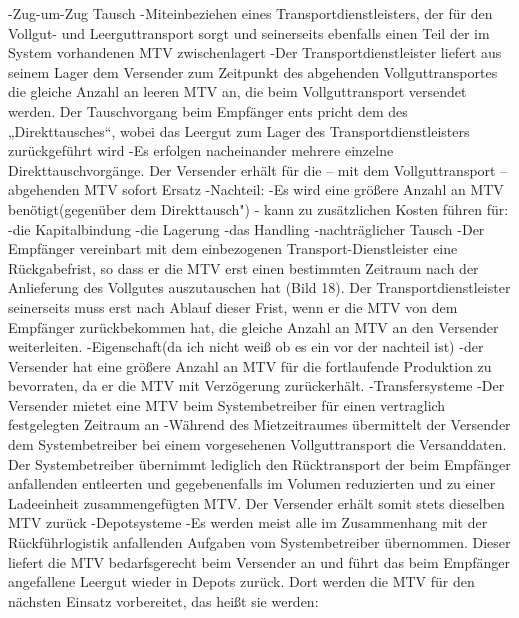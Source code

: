                     -Zug-um-Zug Tausch
                        -Miteinbeziehen eines Transportdienstleisters, der für den Vollgut- und Leerguttransport sorgt und seinerseits ebenfalls einen Teil der im System vorhandenen MTV zwischenlagert
                        -Der Transportdienstleister liefert aus seinem Lager dem Versender zum Zeitpunkt des abgehenden Vollguttransportes die gleiche Anzahl an leeren MTV an, die beim Vollguttransport versendet werden. Der Tauschvorgang beim Empfänger ents pricht dem des „Direkttausches“, wobei das Leergut zum Lager des Transportdienstleisters zurückgeführt wird
                        -Es erfolgen nacheinander mehrere einzelne Direkttauschvorgänge. Der Versender erhält für die – mit dem Vollguttransport – abgehenden MTV sofort Ersatz
                        -Nachteil:
                            -Es wird eine größere Anzahl an MTV benötigt(gegenüber dem Direkttausch")
                                - kann zu zusätzlichen Kosten führen für: 
                                    -die Kapitalbindung 
                                    -die Lagerung 
                                    -das Handling
                    -nachträglicher Tausch
                        -Der Empfänger vereinbart mit dem einbezogenen Transport-Dienstleister eine Rückgabefrist, so dass er die MTV erst einen bestimmten Zeitraum nach der Anlieferung des Vollgutes auszutauschen hat (Bild 18). Der Transportdienstleister seinerseits muss erst nach Ablauf dieser Frist, wenn er die MTV von dem Empfänger zurückbekommen hat, die gleiche Anzahl an MTV an den Versender weiterleiten.
                        -Eigenschaft(da ich nicht weiß ob es ein vor der nachteil ist)
                            -der Versender hat eine größere Anzahl an MTV für die fortlaufende Produktion zu bevorraten, da er die MTV mit Verzögerung zurückerhält. 
                -Transfersysteme
                    -Der Versender mietet eine MTV beim Systembetreiber für einen vertraglich festgelegten Zeitraum an
                    -Während des Mietzeitraumes übermittelt der Versender dem Systembetreiber bei einem vorgesehenen Vollguttransport die Versanddaten. Der Systembetreiber übernimmt lediglich den Rücktransport der beim Empfänger anfallenden entleerten und gegebenenfalls im Volumen reduzierten und zu einer Ladeeinheit zusammengefügten MTV. Der Versender erhält somit stets dieselben MTV zurück
                -Depotsysteme
                        -Es werden meist alle im Zusammenhang mit der Rückführlogistik anfallenden Aufgaben vom Systembetreiber übernommen. Dieser liefert die MTV bedarfsgerecht beim Versender an und führt das beim Empfänger angefallene Leergut wieder in Depots zurück. Dort werden die MTV für den nächsten Einsatz vorbereitet, das heißt sie werden:
